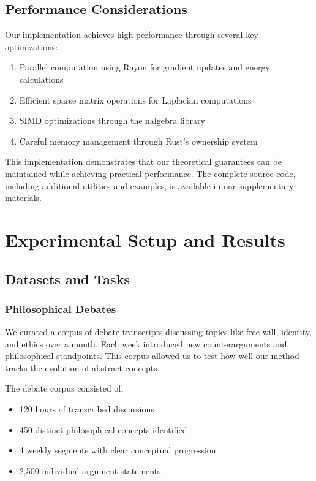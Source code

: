 \documentclass{article}
\begin{document}
\subsection{Performance Considerations}
Our implementation achieves high performance through several key optimizations:

\begin{enumerate}
    \item Parallel computation using Rayon for gradient updates and energy calculations
    \item Efficient sparse matrix operations for Laplacian computations
    \item SIMD optimizations through the nalgebra library
    \item Careful memory management through Rust's ownership system
\end{enumerate}

This implementation demonstrates that our theoretical guarantees can be maintained while achieving practical performance. The complete source code, including additional utilities and examples, is available in our supplementary materials.

\section{Experimental Setup and Results}

\subsection{Datasets and Tasks}
\subsubsection{Philosophical Debates}
We curated a corpus of debate transcripts discussing topics like free will, identity, and ethics over a month. Each week introduced new counterarguments and philosophical standpoints. This corpus allowed us to test how well our method tracks the evolution of abstract concepts.

The debate corpus consisted of:
\begin{itemize}
    \item 120 hours of transcribed discussions
    \item 450 distinct philosophical concepts identified
    \item 4 weekly segments with clear conceptual progression
    \item 2,500 individual argument statements
\end{itemize}
\end{document}
